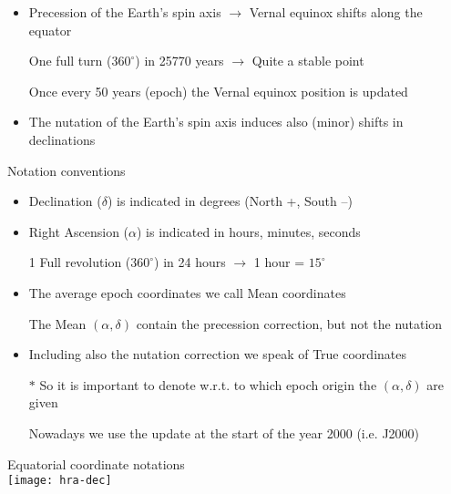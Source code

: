 \Tr
\onecolumn
\begin{itemize}
\item Precession of the Earth's spin axis $\rightarrow$ Vernal equinox shifts along the equator
\item[] One full turn ($360^{\circ}$) in 25770 years $\rightarrow$ Quite a stable point
\item[] Once every 50 years (epoch) the Vernal equinox position is updated
\item The nutation of the Earth's spin axis induces also (minor) shifts in declinations
\end{itemize}
%
\begin{center}
{\red Notation conventions}
\end{center}
%
\begin{itemize}
\item {\blue Declination ($\delta$)} is indicated in degrees (North +, South --)
\item {\blue Right Ascension ($\alpha$)} is indicated in hours, minutes, seconds
\item[] 1 Full revolution ($360^{\circ}$) in 24 hours $\rightarrow$ 1 hour = $15^{\circ}$
\item The average epoch coordinates we call {\blue Mean coordinates}
\item[] The Mean $(\alpha,\delta)$ contain the precession correction, but not the nutation
\item Including also the nutation correction we speak of {\blue True coordinates}
\item[$\ast$] So it is important to denote w.r.t. to which epoch origin the $(\alpha,\delta)$ are given
\item[] Nowadays we use the update at the start of the year 2000 (i.e. J2000)
\end{itemize}

\Tr
\onecolumn
\begin{center}
{\blue Equatorial coordinate notations}\\[3mm]
\texttt{[image: hra-dec]}
\end{center}

